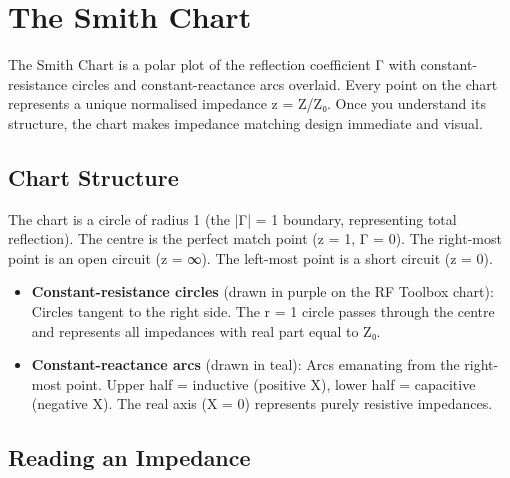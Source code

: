 \section{The Smith Chart}\label{sec:wiki_smith_chart_tutorial}



The Smith Chart is a polar plot of the reflection coefficient Γ with constant-resistance circles and constant-reactance arcs overlaid. Every point on the chart represents a unique normalised impedance z = Z/Z₀. Once you understand its structure, the chart makes impedance matching design immediate and visual.

      

\subsection{Chart Structure}

      

The chart is a circle of radius 1 (the |Γ| = 1 boundary, representing total reflection). The centre is the perfect match point (z = 1, Γ = 0). The right-most point is an open circuit (z = ∞). The left-most point is a short circuit (z = 0).


      
\begin{itemize}

        \item \textbf{Constant-resistance circles} (drawn in purple on the RF Toolbox chart): Circles tangent to the right side. The r = 1 circle passes through the centre and represents all impedances with real part equal to Z₀.

        \item \textbf{Constant-reactance arcs} (drawn in teal): Arcs emanating from the right-most point. Upper half = inductive (positive X), lower half = capacitive (negative X). The real axis (X = 0) represents purely resistive impedances.

      
\end{itemize}

      

\subsection{Reading an Impedance}


